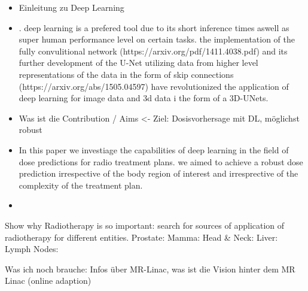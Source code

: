 \begin{itemize}
    \item Einleitung zu Deep Learning
    \item . deep learning is a prefered tool due to its short inference times aswell as super human performance level on certain tasks. the implementation of the fully convulitional network (https://arxiv.org/pdf/1411.4038.pdf) and its further development of the U-Net utilizing data from higher level representations of the data in the form of skip connections (https://arxiv.org/abs/1505.04597) have revolutionized the application of deep learning for image data and 3d data i the form of a 3D-UNets. 
    
    \item Was ist die Contribution / Aims <- Ziel: Dosisvorhersage mit DL, möglichst robust
    \item In this paper we investiage the capabilities of deep learning in the field of dose predictions for radio treatment plans. we aimed to achieve a robust dose prediction irrespective of the body region of interest and irresprective of the complexity of the treatment plan.
    \item 
\end{itemize}




Show why Radiotherapy is so important: search for sources of application of radiotherapy for different entities. Prostate: \cite{geinitz_3d_2005, nguyen_curative_2005, budiharto_external_nodate} Mamma: \cite{ragaz_adjuvant_1997, lena_combined_nodate, taylor_estimating_2017} Head \& Neck: \cite{datta_head_1990, bhide_advances_2010, castadot_adaptive_2010, morgan_adaptive_2020} Liver: \cite{hoyer_radiotherapy_2012, wulf_stereotactic_2001, wulf_stereotactic_2006, sterzing_stereotactic_2014, witt_mri-guided_2020} Lymph Nodes: \cite{degro_degro_2014, matsushita_stereotactic_2018, mikell_postoperative_2015, lundstedt_long-term_2012, jereczek-fossa_is_2015}

Was ich noch brauche: Infos über MR-Linac, was ist die Vision hinter dem MR Linac (online adaption) 

